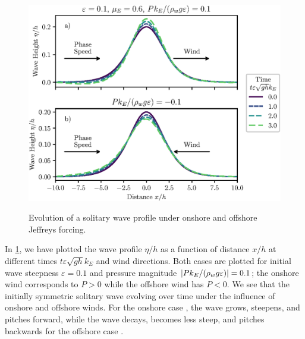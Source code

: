 \documentclass{jfm}
\renewcommand*{\epsilon}{\varepsilon}
\begin{document}
\begin{figure}
  \centering
  { %
    \label{fig:snapshots_solitary:a}
    \label{fig:snapshots_solitary:b}
  }
  \includegraphics{Snapshots-Positive-Negative.eps}
  \caption{
    Evolution of a solitary wave profile under
    onshore and
    offshore Jeffreys forcing.
  }
  \label{fig:snapshots_solitary}
\end{figure}

In \cref{fig:snapshots_solitary}, we have plotted the wave profile
$\eta/h$ as a function of distance $x/h$ at different times $t \epsilon
\sqrt{g h} k_E$ and wind directions.
Both cases are plotted for initial wave steepness $\epsilon = 0.1$ and
pressure magnitude $\abs{P k_E/(\rho_w g \epsilon)} = 0.1$; the onshore
wind  corresponds to $P>0$ while the
offshore wind  has $P<0$.
We see that the initially symmetric solitary wave evolving over time
under the influence of  onshore and
 offshore winds.
For the onshore case , the wave grows,
steepens, and pitches forward, while the wave decays, becomes less
steep, and pitches backwards for the offshore case
.
\end{document}
